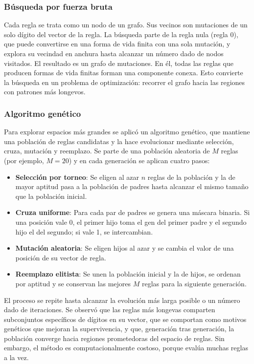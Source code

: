 \subsubsection{Búsqueda por fuerza bruta} 

Cada regla se trata como un nodo de un grafo. Sus vecinos son mutaciones de un solo dígito del vector de la regla. La búsqueda parte de la regla nula (regla 0), que puede convertirse en una forma de vida finita con una sola mutación, y explora su vecindad en anchura hasta alcanzar un número dado de nodos visitados. El resultado es un grafo de mutaciones. En él, todas las reglas que producen formas de vida finitas forman una componente conexa. Esto convierte la búsqueda en un problema de optimización: recorrer el grafo hacia las regiones con patrones más longevos.

\subsubsection{Algoritmo genético}

Para explorar espacios más grandes se aplicó un algoritmo genético, que mantiene una población de reglas candidatas y la hace evolucionar mediante selección, cruza, mutación y reemplazo. Se parte de una población aleatoria de $M$ reglas (por ejemplo, $M = 20$) y en cada generación se aplican cuatro pasos:
	
\begin{itemize}
	\item \textbf{Selección por torneo}: Se eligen al azar $n$ reglas de la población y la de mayor aptitud pasa a la población de padres hasta alcanzar el mismo tamaño que la población inicial.
	
	\item \textbf{Cruza uniforme}: Para cada par de padres se genera una máscara binaria. Si una posición vale 0, el primer hijo toma el gen del primer padre y el segundo hijo el del segundo; si vale 1, se intercambian. 
	
	\item \textbf{Mutación aleatoria}: Se eligen hijos al azar y se cambia el valor de una posición de su vector de regla.
	
	\item \textbf{Reemplazo elitista}: Se unen la población inicial y la de hijos, se ordenan por aptitud y se conservan las mejores $M$ reglas para la siguiente generación.
\end{itemize}
	
El proceso se repite hasta alcanzar la evolución más larga posible o un número dado de iteraciones. Se observó que las reglas más longevas comparten subconjuntos específicos de dígitos en su vector, que se comportan como motivos genéticos que mejoran la supervivencia, y que, generación tras generación, la población converge hacia regiones prometedoras del espacio de reglas. Sin embargo, el método es computacionalmente costoso, porque evalúa muchas reglas a la vez.
	
